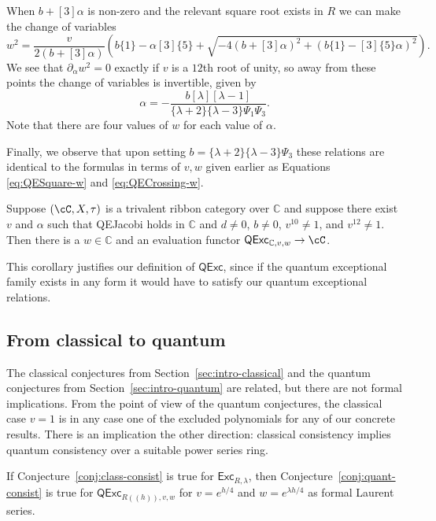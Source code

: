 \documentclass[12pt]{amsart}
\begin{document}
When $b+[3]\alpha$ is non-zero and the relevant square root exists in $R$ we can make the change of variables
\begin{equation}\label{eq:change-variables}
  w^2 = \frac{v}{2(b+[3]\alpha)}\left(b \{1\} -\alpha [3] \{5\} + \sqrt{-4 (b+[3]\alpha)^2 + (b \{1\} -[3]\{5\}\alpha)^2} \right).
\end{equation}
We see that $\partial_\alpha w^2 = 0$ exactly if $v$ is a $12$th root of
unity, so away from these points the change of variables is invertible, given
by
$$\alpha =  -\frac{b[\lambda][\lambda-1]}{\{\lambda+2\}\{\lambda-3\}\Psi_1\Psi_3}.$$
Note that there are four values of $w$ for each value of $\alpha$.

Finally, we observe that upon setting $b =
\{\lambda+2\}\{\lambda-3\}\Psi_3$ these relations are identical to
the formulas in terms of $v,w$ given earlier as Equations
\eqref{eq:QESquare-w} and \eqref{eq:QECrossing-w}.

\begin{corollary}
Suppose $(\cC, X, \tau)$ is a trivalent ribbon category over $\mathbb{C}$ and
suppose there exist $v$ and $\alpha$ such that QEJacobi holds in $\mathbb{C}$
and $d \neq 0 $, $b \neq 0$, $v^{10} \neq 1$, and $v^{12} \neq 1$.  Then there
is a $w \in \mathbb{C}$ and an evaluation functor
$\mathsf{QExc}_{\mathbb{C},v,w} \rightarrow \cC$.
\end{corollary}

This corollary justifies our definition of $\mathsf{QExc}$, since if the
quantum exceptional family exists in any form it would have to satisfy our
quantum exceptional relations.

\subsection{From classical to quantum}
The classical conjectures from Section~\ref{sec:intro-classical} and
the quantum conjectures from Section~\ref{sec:intro-quantum} are
related, but there are not formal implications. From the point of view
of the quantum conjectures, the classical case $v=1$ is in any case
one of the excluded polynomials for any of our concrete results. There
is an implication the other direction: classical consistency implies
quantum consistency over a suitable power series ring.
\begin{theorem}\label{thm:classical-quantum}
  If Conjecture~\ref{conj:class-consist} is true
  for $\mathsf{Exc}_{R,\lambda}$, then
  Conjecture~\ref{conj:quant-consist} is true for
  $\mathsf{QExc}_{R((h)),v,w}$ for $v=e^{h/4}$ and $w=e^{\lambda
    h/4}$ as formal Laurent series.
\end{theorem}
\end{document}
